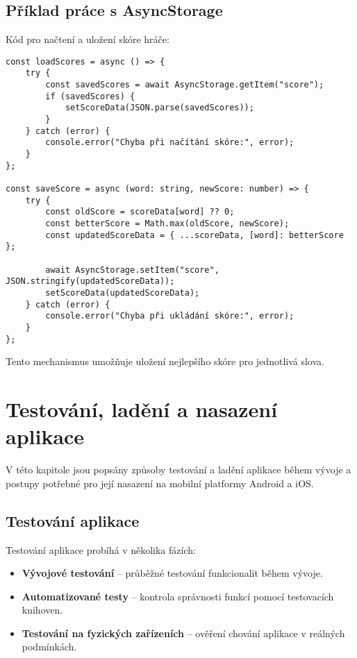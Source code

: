 \documentclass[a4paper,12pt]{article}
\begin{document}
\subsection{Příklad práce s AsyncStorage}

Kód pro načtení a uložení skóre hráče:

\begin{verbatim}
const loadScores = async () => {
    try {
        const savedScores = await AsyncStorage.getItem("score");
        if (savedScores) {
            setScoreData(JSON.parse(savedScores));
        }
    } catch (error) {
        console.error("Chyba při načítání skóre:", error);
    }
};

const saveScore = async (word: string, newScore: number) => {
    try {
        const oldScore = scoreData[word] ?? 0;
        const betterScore = Math.max(oldScore, newScore);
        const updatedScoreData = { ...scoreData, [word]: betterScore };

        await AsyncStorage.setItem("score", JSON.stringify(updatedScoreData));
        setScoreData(updatedScoreData);
    } catch (error) {
        console.error("Chyba při ukládání skóre:", error);
    }
};
\end{verbatim}

Tento mechanismus umožňuje uložení nejlepšího skóre pro jednotlivá slova.

\section{Testování, ladění a nasazení aplikace}

V této kapitole jsou popsány způsoby testování a ladění aplikace během vývoje a postupy potřebné pro její nasazení na mobilní platformy Android a iOS.

\subsection{Testování aplikace}

Testování aplikace probíhá v několika fázích:
\begin{itemize}
    \item \textbf{Vývojové testování} – průběžné testování funkcionalit během vývoje.
    \item \textbf{Automatizované testy} – kontrola správnosti funkcí pomocí testovacích knihoven.
    \item \textbf{Testování na fyzických zařízeních} – ověření chování aplikace v reálných podmínkách.
\end{itemize}
\end{document}
